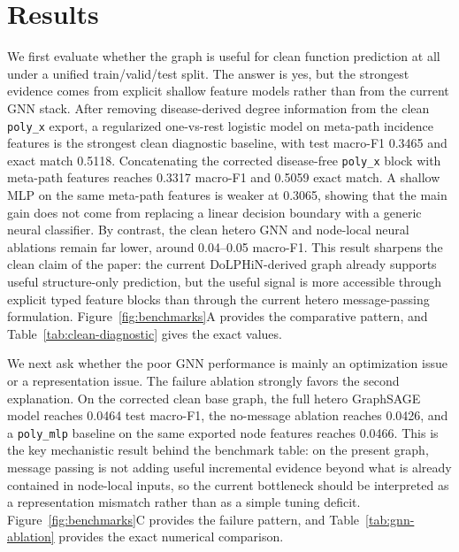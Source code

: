 \documentclass[11pt]{article}
\begin{document}
\section{Results}
\label{sec:experiments}

We first evaluate whether the graph is useful for clean function prediction at all under a unified train/valid/test split. The answer is yes, but the strongest evidence comes from explicit shallow feature models rather than from the current GNN stack. After removing disease-derived degree information from the clean \texttt{poly\_x} export, a regularized one-vs-rest logistic model on meta-path incidence features is the strongest clean diagnostic baseline, with test macro-F1 0.3465 and exact match 0.5118. Concatenating the corrected disease-free \texttt{poly\_x} block with meta-path features reaches 0.3317 macro-F1 and 0.5059 exact match. A shallow MLP on the same meta-path features is weaker at 0.3065, showing that the main gain does not come from replacing a linear decision boundary with a generic neural classifier. By contrast, the clean hetero GNN and node-local neural ablations remain far lower, around 0.04--0.05 macro-F1. This result sharpens the clean claim of the paper: the current DoLPHiN-derived graph already supports useful structure-only prediction, but the useful signal is more accessible through explicit typed feature blocks than through the current hetero message-passing formulation. Figure~\ref{fig:benchmarks}A provides the comparative pattern, and Table~\ref{tab:clean-diagnostic} gives the exact values.

We next ask whether the poor GNN performance is mainly an optimization issue or a representation issue. The failure ablation strongly favors the second explanation. On the corrected clean base graph, the full hetero GraphSAGE model reaches 0.0464 test macro-F1, the no-message ablation reaches 0.0426, and a \texttt{poly\_mlp} baseline on the same exported node features reaches 0.0466. This is the key mechanistic result behind the benchmark table: on the present graph, message passing is not adding useful incremental evidence beyond what is already contained in node-local inputs, so the current bottleneck should be interpreted as a representation mismatch rather than as a simple tuning deficit. Figure~\ref{fig:benchmarks}C provides the failure pattern, and Table~\ref{tab:gnn-ablation} provides the exact numerical comparison.
\end{document}
